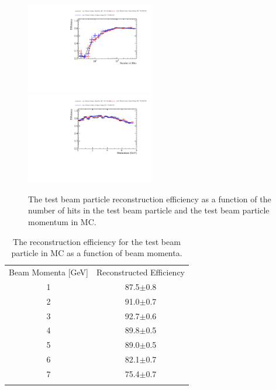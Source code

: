 \begin{figure}
\includegraphics[width=0.5\textwidth]{Figures/Metrics/MC/Beam/BeamParticleEfficiencyBreakdownVsNHits.pdf}
\includegraphics[width=0.5\textwidth]{Figures/Metrics/MC/Beam/BeamParticleEfficiencyBreakdownVsMomentum.pdf}
\caption{The test beam particle reconstruction efficiency as a function of the number of hits in the test beam particle and the test beam particle momentum in MC.}
\label{fig:1}
\end{figure}

\begin{table}
\caption{The reconstruction efficiency for the test beam particle in MC as a function of beam momenta.}
\label{tab:1} 
\begin{tabular}{cc}
\hline\noalign{\smallskip}
Beam Momenta [GeV] & Reconstructed Efficiency  \\
\noalign{\smallskip}\hline\noalign{\smallskip}
1 & 87.5$\pm$0.8 \\
2 & 91.0$\pm$0.7 \\
3 & 92.7$\pm$0.6 \\
4 & 89.8$\pm$0.5 \\
5 & 89.0$\pm$0.5 \\
6 & 82.1$\pm$0.7 \\
7 & 75.4$\pm$0.7 \\
\noalign{\smallskip}\hline
\end{tabular}
\end{table}

